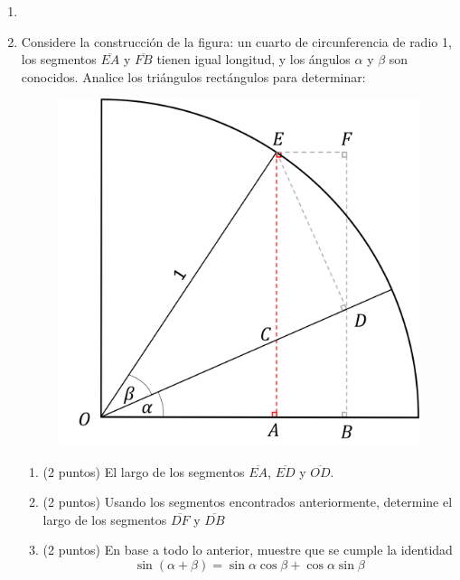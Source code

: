 \documentclass[letterpaper,11pt]{article}
\begin{document}
\vspace{-1cm}
\begin{enumerate}\setlength{\itemsep}{0.4cm}


\item[]

\item Considere la construcción de la figura: un cuarto de circunferencia de radio 1, los segmentos $\overline{EA}$ y $\overline{FB}$ tienen igual longitud, y los ángulos $\alpha$ y $\beta$ son conocidos. Analice los triángulos rectángulos para determinar:

\begin{multicols}{2}
    \begin{figure}[H]
        \centering
        \includegraphics[width=0.8\linewidth]{2023-1/img/ejercicios/ej1.png}
    \end{figure}
    \columnbreak
    \begin{enumerate}
        \item (2 puntos) El largo de los segmentos $\overline{EA}$, $\overline{ED}$ y $\overline{OD}$.
        
        \item (2 puntos) Usando los segmentos encontrados anteriormente, determine el largo de los segmentos $\overline{DF}$ y $\overline{DB}$
        
        \item (2 puntos) En base a todo lo anterior, muestre que se cumple la identidad $$\sin\left(\alpha+\beta\right) = \sin\alpha\cos\beta+\cos\alpha\sin\beta$$
        

\end{enumerate}
\end{multicols}
\end{enumerate}
\end{document}
